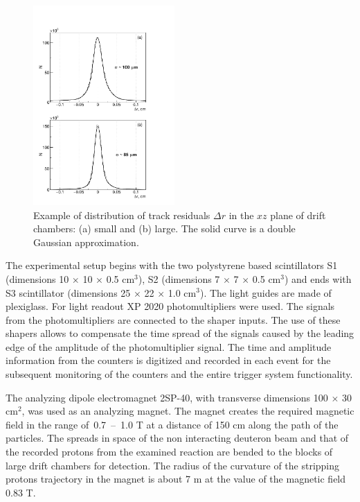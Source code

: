 \documentclass[twocolumn,epjc3]{svjour3}
\begin{document}
\begin{figure}[ht]
  \centering
  \includegraphics[width=0.48\textwidth]{res_chambers.pdf}
  \caption{Example of distribution of track residuals $\Delta r$ in the $xz$
    plane of drift chambers: (a) small and (b) large. The solid curve is a
    double Gaussian approximation.}
  \label{fig:res_chambers}
\end{figure}

The experimental setup begins with the two polystyrene based scintillators S1
(dimensions 10 $\times$ 10 $\times$ 0.5 cm$^3$), S2 (dimensions 7 $\times$ 7
$\times$ 0.5 cm$^3$) and ends with S3 scintillator (dimensions 25 $\times$ 22
$\times$ 1.0 cm$^3$). The light guides are made of plexiglass. For light readout
XP 2020 photomultipliers were used. The signals from the photomultipliers are
connected to the shaper inputs. The use of these shapers allows to compensate
the time spread of the signals caused by the leading edge of the amplitude of
the photomultiplier signal. The time and amplitude information from the counters
is digitized and recorded in each event for the subsequent monitoring of the
counters and the entire trigger system functionality.

The analyzing dipole electromagnet 2SP-40, with transverse dimensions 100
$\times$ 30 cm$^2$, was used as an analyzing magnet. The magnet creates the
required magnetic field in the range of \,0.7~--~1.0 T at a distance of 150 cm
along the path of the particles. The spreads in space of the non interacting
deuteron beam and that of the recorded protons from the examined reaction are
bended to the blocks of large drift chambers for detection. The radius of the
curvature of the stripping protons trajectory in the magnet is about 7 m at the
value of the magnetic field 0.83 T.
\end{document}
